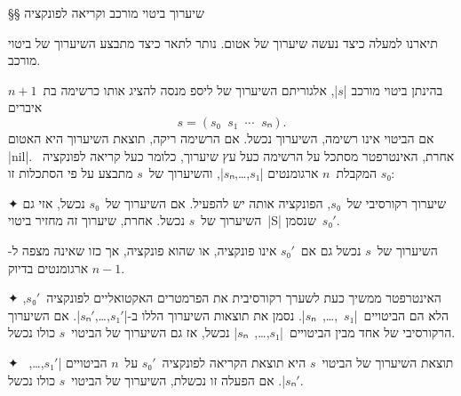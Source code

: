 §§ שיערוך ביטוי מורכב וקריאה לפונקציה

תיארנו למעלה כיצד נעשה שיערוך של אטום. נותר לתאר כיצד מתבצע השיערוך של ביטוי
מורכב.

\begin{mdframed}[backgroundcolor=Lavender!20]
  בהינתן ביטוי מורכב \E|$s$|, אלגוריתם השיערוך של ליספ מנסה
  להציג אותו כרשימה בת~$n+1$ איברים \[
    s=(s₀\;\;s₁\;\;⋯\;\;sₙ).
\] אם הביטוי אינו רשימה, השיערוך נכשל. אם הרשימה ריקה, תוצאת השיערוך היא האטום
  \T|nil|. אחרת, האינטרפטר מסתכל על הרשימה כעל עץ שיערוך, כלומר כעל קריאה
  לפונקציה~$s₀$ המקבלת~$n$ ארגומנטים \E|$s₁$,…,$sₙ$|, והשיערוך
  של~$s$ מתבצע על פי הסתכלות זו:
  \begin{enumerate}
    ✦ שיערוך רקורסיבי של~$s₀$, הפונקציה אותה יש להפעיל. אם השיערוך של~$s₀$ נכשל,
    אזי גם השיערוך של~$s$ נכשל. אחרת, שיערוך זה מחזיר ביטוי~\E|S| שנסמן~$s₀'$.

    השיערוך של~$s$ נכשל גם אם~$s₀'$ אינו פונקציה, או שהוא פונקציה, אך כזו שאינה
    מצפה ל-$n-1$ ארגומנטים בדיוק.

    ✦ האינטרפטר ממשיך כעת לשערך רקורסיבית את הפרמטרים האקטואליים לפונקציה~$s₀'$,
    הלא הם הביטויים~\E|$s₁$~,…,~$sₙ$|. נסמן את תוצאות השיערוך הללו
    ב-\E|$s₁'$,…,$sₙ'$|. אם השיערוך הרקורסיבי של אחד מבין
    הביטויים~\E|$s₁$,…,~$sₙ$| נכשל, אז גם השיערוך של הביטוי~$s$
    כולו נכשל.

    ✦ תוצאת השיערוך של הביטוי~$s$ היא תוצאת הקריאה לפונקציה~$s₀'$ על~$n$ הביטויים
    \E|$s₁'$,…,~$sₙ'$|. אם הפעלה זו נכשלת, השיערוך של הביטוי~$s$ כולו נכשל.
  \end{enumerate}
\end{mdframed}

